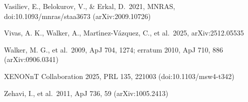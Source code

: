 \documentclass[
  10pt,
]{article}
\begin{document}
{\begin{list}{}{\setlength{\leftmargin}{1.5em}\setlength{\itemindent}{-1.5em}\setlength{\itemsep}{1pt}\setlength{\parsep}{0pt}}
\item Vasiliev, E., Belokurov, V., \& Erkal, D.\ 2021, MNRAS, doi:10.1093/mnras/staa3673 (arXiv:2009.10726)
\item Vivas, A. K., Walker, A., Mart\'{\i}nez-V\'azquez, C., et al.\ 2025, arXiv:2512.05535
\item Walker, M. G., et al.\ 2009, ApJ 704, 1274; erratum 2010, ApJ 710, 886 (arXiv:0906.0341)
\item XENONnT Collaboration 2025, PRL 135, 221003 (doi:10.1103/msw4-t342)
\item Zehavi, I., et al.\ 2011, ApJ 736, 59 (arXiv:1005.2413)
\end{list}}
\end{document}
